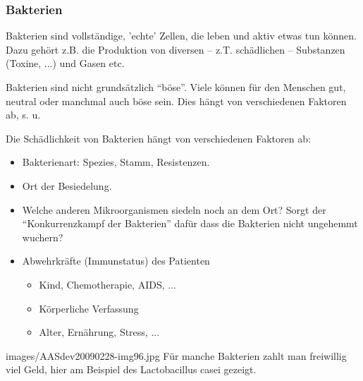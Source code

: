 \subsubsection{Bakterien}



Bakterien sind vollständige,
'echte' Zellen, die leben
und aktiv etwas tun können. Dazu gehört z.B. die Produktion
von diversen -- z.T. schädlichen -- Substanzen (Toxine, ...) und Gasen etc.

Bakterien sind nicht grundsätzlich "`böse"'. Viele können
für den Menschen gut, neutral oder manchmal auch böse sein.
Dies hängt von verschiedenen Faktoren ab, s. u.



{
Die Schädlichkeit von Bakterien hängt von verschiedenen Faktoren ab:

\begin{itemize}
  \item Bakterienart: Spezies, Stamm, Resistenzen.
  \item Ort der Besiedelung.
  \item Welche anderen Mikroorganismen siedeln noch an
  dem Ort? Sorgt der "`Konkurrenzkampf der Bakterien"' dafür dass die
  Bakterien nicht ungehemmt wuchern?
  \item Abwehrkräfte (Immunstatus) des Patienten
  \begin{itemize}
    \item Kind, Chemotherapie, AIDS, ...
    \item Körperliche Verfassung
    \item Alter, Ernährung, Stress, ...
  \end{itemize}
\end{itemize}
}{}
{images/AASdev20090228-img96.jpg}
{Für manche Bakterien zahlt man
    freiwillig viel Geld, hier am Beispiel des
    Lactobacillus casei gezeigt.}
{}




